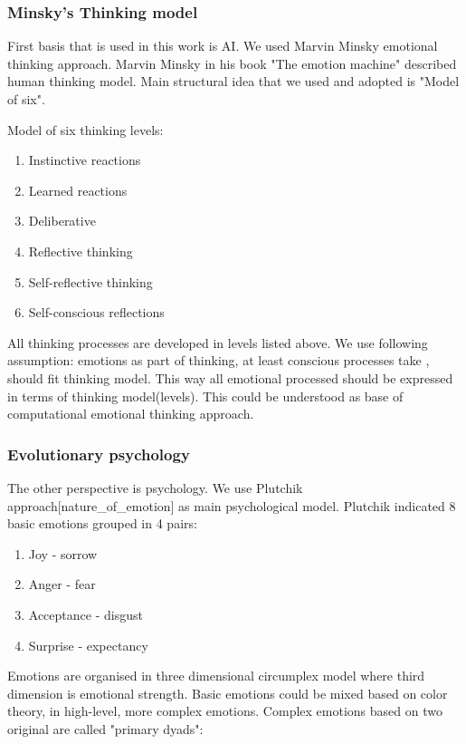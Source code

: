 \subsubsection{Minsky's Thinking model}

First basis that is used in this work is  AI. We used Marvin Minsky emotional thinking approach.
Marvin Minsky in his book "The emotion machine" \cite{emotion_machine} described human thinking model. Main structural idea that we used and adopted is "Model of six".

Model of six thinking levels:

\begin{enumerate}
\item  Instinctive reactions
\item  Learned reactions
\item  Deliberative
\item  Reflective thinking
\item  Self-reflective thinking
\item  Self-conscious reflections
\end{enumerate}

All thinking processes are developed in levels listed above. We use following assumption: emotions as part of thinking, at least conscious processes take , should fit thinking model. This way all emotional processed should be expressed in terms of thinking model(levels). This could be understood as base of computational emotional thinking approach.

\subsubsection{Evolutionary psychology}

The other perspective is psychology.  We use Plutchik approach[nature_of_emotion] as main psychological model. Plutchik indicated 8 basic emotions grouped in 4 pairs:

\begin{enumerate}
\item  Joy - sorrow
\item  Anger - fear
\item  Acceptance - disgust
\item  Surprise - expectancy
\end{enumerate}

Emotions are organised in three dimensional circumplex model where third dimension is emotional strength. Basic emotions could be mixed based on color theory, in high-level, more complex emotions. Complex emotions based on two original are called "primary dyads":

